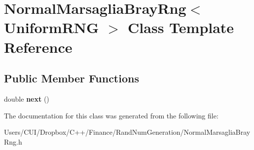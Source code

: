 \hypertarget{class_normal_marsaglia_bray_rng}{}\section{Normal\+Marsaglia\+Bray\+Rng$<$ Uniform\+R\+NG $>$ Class Template Reference}
\label{class_normal_marsaglia_bray_rng}
\subsection*{Public Member Functions}
\begin{DoxyCompactItemize}
\item 
\hypertarget{class_normal_marsaglia_bray_rng_a2cc54f5f331a5bd71eedc67c84db7279}{}\label{class_normal_marsaglia_bray_rng_a2cc54f5f331a5bd71eedc67c84db7279} 
double {\bfseries next} ()
\end{DoxyCompactItemize}


The documentation for this class was generated from the following file\+:\begin{DoxyCompactItemize}
\item 
Users/\+C\+U\+I/\+Dropbox/\+C++/\+Finance/\+Rand\+Num\+Generation/Normal\+Marsaglia\+Bray\+Rng.\+h\end{DoxyCompactItemize}
